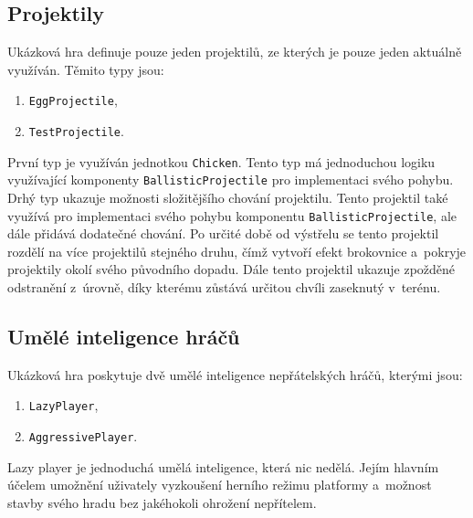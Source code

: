 \medskip
{}

\subsection{Projektily}
Ukázková hra definuje pouze jeden projektilů, ze kterých je pouze jeden aktuálně využíván. Těmito typy jsou:

\begin{enumerate}
	\item \texttt{EggProjectile},
	\item \texttt{TestProjectile}.
\end{enumerate}

První typ je využíván jednotkou \texttt{Chicken}. Tento typ má jednoduchou logiku využívající komponenty \texttt{BallisticProjectile} pro implementaci svého pohybu. Drhý typ ukazuje možnosti složitějšího chování projektilu. Tento projektil také využívá pro implementaci svého pohybu komponentu \texttt{BallisticProjectile}, ale dále přidává dodatečné chování. Po určité době od výstřelu se tento projektil rozdělí na více projektilů stejného druhu, čímž vytvoří efekt brokovnice a~pokryje projektily okolí svého původního dopadu. Dále tento projektil ukazuje zpožděné odstranění z~úrovně, díky kterému zůstává určitou chvíli zaseknutý v~terénu.

\subsection{Umělé inteligence hráčů}
Ukázková hra poskytuje dvě umělé inteligence nepřátelských hráčů, kterými jsou:

\begin{enumerate}
	\item \texttt{LazyPlayer},
	\item \texttt{AggressivePlayer}.
\end{enumerate}

Lazy player je jednoduchá umělá inteligence, která nic nedělá. Jejím hlavním účelem umožnění uživately vyzkoušení herního režimu platformy a~možnost stavby svého hradu bez jakéhokoli ohrožení nepřítelem.

